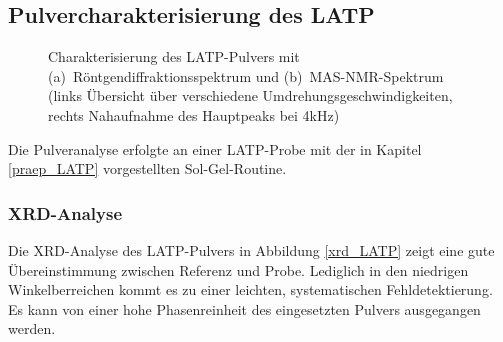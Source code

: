 \documentclass[a4paper, 11pt, headsepline,footsepline,twoside,abstract]{scrbook}
\begin{document}
\subsection{Pulvercharakterisierung des LATP}
\begin{figure}
   \centering
       \vspace{6mm}
       \vspace{3mm}
	\caption{Charakterisierung des LATP-Pulvers mit (a)~Röntgen\-diffraktionsspektrum und (b)~MAS-NMR-Spektrum (links Übersicht über verschiedene Umdrehungsgeschwindigkeiten, rechts Nahaufnahme des Hauptpeaks bei 4kHz)}
   	\label{pulver_LATP}
\end{figure}
Die Pulveranalyse erfolgte an einer LATP-Probe mit der in Kapitel \ref{praep_LATP} vorgestellten Sol-Gel-Routine.
\subsubsection{XRD-Analyse}
Die XRD-Analyse des LATP-Pulvers in Abbildung \ref{xrd_LATP} zeigt eine gute Übereinstimmung zwischen Referenz und Probe. Lediglich in den niedrigen Winkelberreichen kommt es zu einer leichten, systematischen Fehldetektierung. Es kann von einer hohe Phasenreinheit des eingesetzten Pulvers ausgegangen werden.
\end{document}

